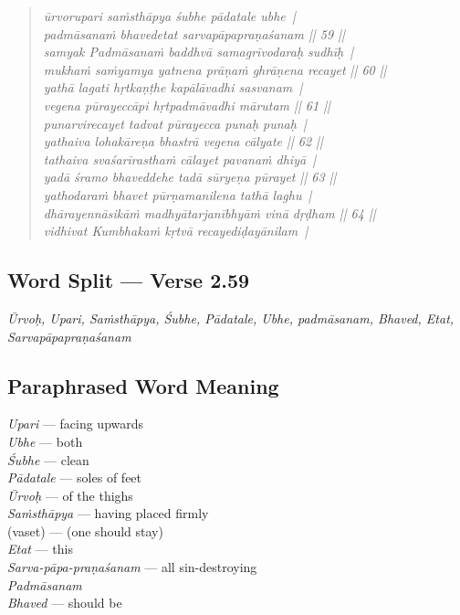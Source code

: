 \begin{verse}
\textit{ūrvorupari saṁsthāpya śubhe pādatale ubhe |\\
padmāsanaṁ bhavedetat sarvapāpapraṇaśanam || 59 ||\\
samyak Padmāsanaṁ baddhvā samagrīvodaraḥ sudhīḥ |\\ 
mukhaṁ saṁyamya yatnena prāṇaṁ ghrāṇena recayet || 60 ||\\
yathā lagati hṛtkaṇṭhe kapālāvadhi sasvanam |\\
vegena pūrayeccāpi hṛtpadmāvadhi mārutam || 61 ||\\
punarvirecayet tadvat pūrayecca punaḥ punaḥ |\\
yathaiva lohakāreṇa bhastrā vegena cālyate || 62 ||\\
tathaiva svaśarīrasthaṁ cālayet pavanaṁ dhiyā |\\
yadā śramo bhaveddehe tadā sūryeṇa pūrayet || 63 ||\\
yathodaraṁ bhavet pūrṇamanilena tathā laghu |\\
dhārayennāsikāṁ madhyātarjanībhyāṁ vinā dṛḍham || 64 ||\\
vidhivat Kumbhakaṁ kṛtvā recayediḍayānilam |}
\end{verse}

\subsection*{Word Split --- Verse 2.59}


\textit{Ūrvoḥ, Upari, Saṁsthāpya, Śubhe, Pādatale, Ubhe, padmāsanam, Bhaved, Etat, Sarvapāpapraṇaśanam}

\subsection*{Paraphrased Word Meaning}


\begin{multicols}{2}
\textit{Upari} --- facing upwards \\
\textit{Ubhe} --- both \\
\textit{Śubhe} --- clean\\ 
\textit{Pādatale} --- soles of feet \\
\textit{Ūrvoḥ} ---  of the thighs \\
\textit{Saṁsthāpya} --- having placed firmly \\
(vaset) --- (one should stay)\\
\textit{Etat} --- this \\
\textit{Sarva-pāpa-praṇaśanam} --- all sin-destroying \\
\textit{Padmāsanam} \\
\textit{Bhaved} --- should be
\end{multicols}

